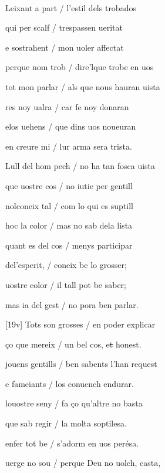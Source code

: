 \documentclass[12pt]{article}
\renewcommand{\espaiAbansEtiquetaPoema}{\vspace{0ex}}
\begin{document}
\begin{estrofa}

\espaiAbansEtiquetaPoema

\\

\end{estrofa}


\begin{estrofa}

 Leixant a part / l'estil dels trobados

 qui per scalf / trespassen ueritat

 e sostrahent / mon uoler affectat

 perque nom trob / dire'lque trobe en uos

 tot mon parlar / als que nous hauran uista

 res noy ualra / car fe noy donaran

 elos uehens / que dins uos noueuran

 en creure mi / lur arma sera trista.

\end{estrofa}



\begin{estrofa}

 Lull del hom pech / no ha tan fosca uista

 que uostre cos / no iutie per gentill

 nolconeix tal / com lo qui es suptill

 hoc la color / mas no sab dela lista

 quant es del cos / menys participar

 del'esperit, / coneix be lo grosser;

 uostre color / il tall pot be saber;

 mas ia del gest / no pora ben parlar.

\end{estrofa}



\begin{estrofa}

 [19v] Tots son grosses / en poder explicar

 \c{c}o que mereix / un bel cos, e\sout{t} honest.

 jouens gentills / ben sabents l'han request

 e fameiants / los conuench endurar.

 louostre seny / fa \c{c}o qu'altre no basta

 que sab regir / la molta soptilesa.

 enfer tot be / s'adorm en uos per\'{e}sa.

 uerge no sou / perque Deu no uolch, casta,

\end{estrofa}
\end{document}
